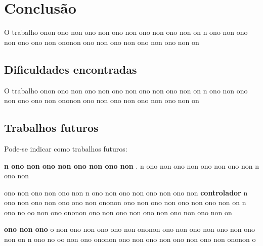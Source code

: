 \chapter{Conclusão}

O trabalho onon ono non ono non ono non ono non ono non on
n ono non ono non ono ono non ononon ono non ono non ono non ono non on
 

\section{Dificuldades encontradas}

O trabalho onon ono non ono non ono non ono non ono non on
n ono non ono non ono ono non ononon ono non ono non ono non ono non on

\section{Trabalhos futuros}

Pode-se indicar como trabalhos futuros:

\textbf{n ono non ono non ono non ono non }.
n ono non ono non ono non ono non n ono non 

ono non ono non ono non n ono non ono non ono non ono non 
\textbf{controlador} n ono non ono non ono ono non ononon ono non ono non ono non ono non on
n ono no oo non ono ononon ono  non ono non ono non ono non ono non on

\textbf{ono non ono}
o non ono non ono ono non ononon ono non ono non ono non ono non on
n ono no oo non ono ononon ono  non ono non ono non ono non ononon o 



